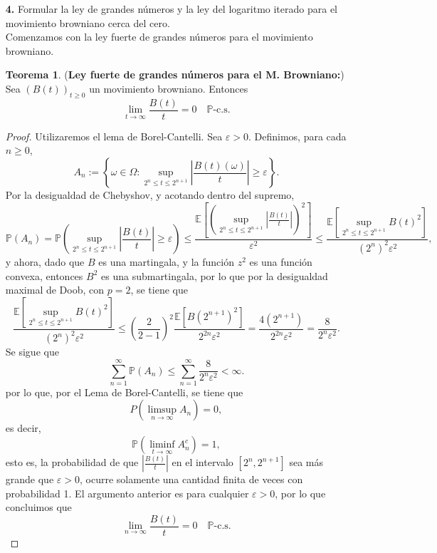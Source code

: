 \documentclass[letterpaper]{article}
\renewcommand{\to}{\rightarrow}
\newcommand{\E}{\mathbb{E}}
\renewcommand{\P}{\mathbb{P}}
\newcommand{\1}{\mathds{1}}
\theoremstyle{definition}
\theoremstyle{definition}
\newtheorem{teo}{Teorema}
\theoremstyle{definition}
\theoremstyle{definition}
\theoremstyle{definition}
\begin{document}
\begin{enumerate}
\begin{proof}
     \end{proof}
    \item [\textbf{4.}] Formular la ley de grandes números y la ley
    del logaritmo iterado para el movimiento browniano cerca del cero.\\

    Comenzamos con la ley fuerte de grandes números para el movimiento browniano.\\
    \begin{teo}(\textbf{Ley fuerte de grandes números para el M. Browniano:})
      Sea $(B(t))_{t\geq0}$ un movimiento browniano. Entonces 
      \[
      \lim_{t\to \infty}\frac{B(t)}{t}=0 \quad \P\text{-c.s.}  
      \]
    \end{teo}
    \begin{proof} 
       Utilizaremos  el lema de Borel-Cantelli. Sea $\varepsilon>0$. Definimos, para cada $n\geq0$, 
       $$A_n:=\left\{\omega \in \Omega: \sup_{2^n\leq t \leq 2^{n+1}}\left|\frac{B(t)(\omega)}{t}\right|\geq\varepsilon\right\}.$$
       Por la desigualdad de Chebyshov, y acotando dentro del supremo, 
       \[
        \P\left(A_n\right)=\P\left(\sup_{2^{n}\leq t \leq 2^{n+1}}\left|\frac{B(t)}{t}\right|\geq\varepsilon\right)\leq \frac{\E\left[\left(\sup_{2^{n}\leq t \leq 2^{n+1}}\left|\frac{B(t)}{t}\right|\right)^2\right]}{\varepsilon^2}
        \leq\frac{\E\left[\sup_{2^{n}\leq t \leq 2^{n+1}}B(t)^2\right]}{(2^n)^2\varepsilon^2},
        \]
        y ahora, dado que $B$ es una martingala, y la función $z^2$ es una función convexa, entonces 
        $B^2$ es una submartingala, por lo que por la desigualdad maximal de Doob, con $p=2$, se tiene que
        \[
          \frac{\E\left[\sup_{2^{n}\leq t \leq 2^{n+1}}B(t)^2\right]}{(2^n)^2\varepsilon^2}\leq \left(\frac{2}{2-1}\right)^2\frac{\E\left[B(2^{n+1})^2\right]}{2^{2n}\varepsilon^2}=\frac{4(2^{n+1})}{2^{2n}\varepsilon^2}=\frac{8}{2^{n}\varepsilon^2}.
        \]
        Se sigue que 
        \[
        \sum_{n=1}^{\infty}\P\left(A_n\right)\leq \sum_{n=1}^{\infty} \frac{8}{2^n\varepsilon^2}<\infty.
        \]
        por lo que, por el Lema de Borel-Cantelli, se tiene que 
        \[
        P\left(\limsup_{n\to \infty}A_n\right)=0,  
        \]
        es decir, 
        \[
        \P\left(\liminf_{t\to \infty}A_n^c\right)=1,  
        \]
        esto es, la probabilidad de que $\left|\frac{B(t)}{t}\right|$ en el intervalo $[2^{n},2^{n+1}]$
        sea más grande que $\varepsilon>0$, ocurre solamente una cantidad finita de veces con probabilidad 1. El argumento anterior
        es para cualquier $\varepsilon>0$, por lo que concluimos que
        \[
        \lim_{n\to \infty}\frac{B(t)}{t}=0 \quad \P\text{-c.s.}  
        \]


\end{proof}
\end{enumerate}
\end{document}
